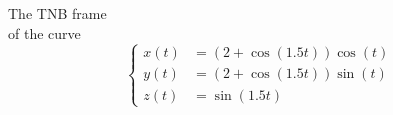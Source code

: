 \documentclass[aspectratio=169]{beamer}
\begin{document}
\begin{frame}[plain]
    \begin{center}
        {\Large The TNB frame}\\[1cm]
        of the curve
        \[\left\{
        \begin{aligned}
            x(t) &= (2 + \cos(1.5t))\cos(t)\\
            y(t) &= (2 + \cos(1.5t))\sin(t)\\
            z(t) &= \sin(1.5t)
        \end{aligned}
        \right.\]
    \end{center}
\end{frame}
\end{document}
